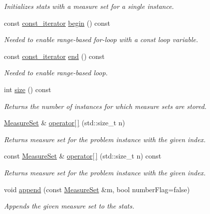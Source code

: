 \begin{DoxyCompactItemize}
\begin{DoxyCompactList}\small\item\em Initializes stats with a measure set for a single instance. \end{DoxyCompactList}\item 
const \hyperlink{structStats_a7dc79881716411ea357945252059a3b7}{const\+\_\+iterator} \hyperlink{structStats_a4d280c5b9a246167ac2ae71e5717de1c}{begin} () const 
\begin{DoxyCompactList}\small\item\em Needed to enable range-\/based for-\/loop with a const loop variable. \end{DoxyCompactList}\item 
const \hyperlink{structStats_a7dc79881716411ea357945252059a3b7}{const\+\_\+iterator} \hyperlink{structStats_ae30f3ae5364351c098b94c4b072f853d}{end} () const 
\begin{DoxyCompactList}\small\item\em Needed to enable range-\/based loop. \end{DoxyCompactList}\item 
int \hyperlink{structStats_aac70b19c1d464cd651c773514a3d40fb}{size} () const 
\begin{DoxyCompactList}\small\item\em Returns the number of instances for which measure sets are stored. \end{DoxyCompactList}\item 
\hyperlink{structMeasureSet}{Measure\+Set} \& \hyperlink{structStats_a34b455d9640972edd89c26828b43b4c9}{operator\mbox{[}$\,$\mbox{]}} (std\+::size\+\_\+t n)
\begin{DoxyCompactList}\small\item\em Returns measure set for the problem instance with the given index. \end{DoxyCompactList}\item 
const \hyperlink{structMeasureSet}{Measure\+Set} \& \hyperlink{structStats_a6306080e07fe3290e5c58d72ec378b13}{operator\mbox{[}$\,$\mbox{]}} (std\+::size\+\_\+t n) const 
\begin{DoxyCompactList}\small\item\em Returns measure set for the problem instance with the given index. \end{DoxyCompactList}\item 
void \hyperlink{structStats_acaa28848b9dc1d13050c7f3dc29722ee}{append} (const \hyperlink{structMeasureSet}{Measure\+Set} \&m, bool number\+Flag=false)
\begin{DoxyCompactList}\small\item\em Appends the given measure set to the stats. \end{DoxyCompactList}\item 

\end{DoxyCompactItemize}
